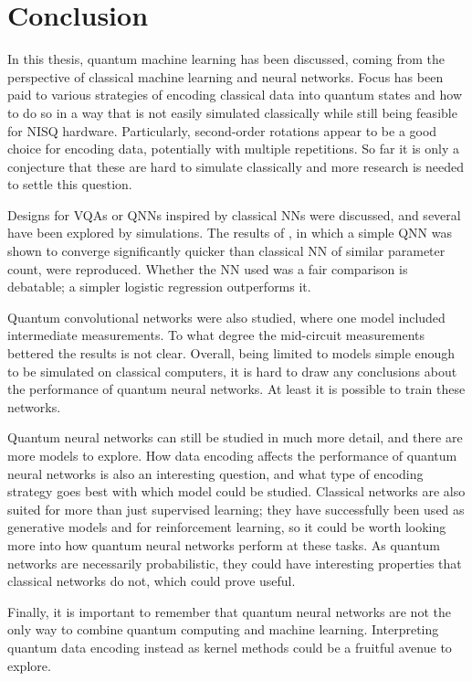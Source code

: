 \chapter{Conclusion}
\label{chap:conclusion}
In this thesis, quantum machine learning has been discussed, coming from the perspective of classical machine learning and neural networks.
Focus has been paid to various strategies of encoding classical data into quantum states and how to do so in a way that is not easily simulated classically while still being feasible for NISQ hardware.
Particularly, second-order rotations appear to be a good choice for encoding data, potentially with multiple repetitions.
So far it is only a conjecture that these are hard to simulate classically and more research is needed to settle this question.

Designs for VQAs or QNNs inspired by classical NNs were discussed, and several have been explored by simulations.
The results of \cite{abbas2021}, in which a simple QNN was shown to converge significantly quicker than classical NN of similar parameter count, were reproduced.
Whether the NN used was a fair comparison is debatable; a simpler logistic regression outperforms it.

Quantum convolutional networks were also studied, where one model included intermediate measurements.
To what degree the mid-circuit measurements bettered the results is not clear.
Overall, being limited to models simple enough to be simulated on classical computers, it is hard to draw any conclusions about the performance of quantum neural networks.
At least it is possible to train these networks.

Quantum neural networks can still be studied in much more detail, and there are more models to explore.
How data encoding affects the performance of quantum neural networks is also an interesting question, and what type of encoding strategy goes best with which model could be studied.
Classical networks are also suited for more than just supervised learning; they have successfully been used as generative models and for reinforcement learning, so it could be worth looking more into how quantum neural networks perform at these tasks.
As quantum networks are necessarily probabilistic, they could have interesting properties that classical networks do not, which could prove useful.

Finally, it is important to remember that quantum neural networks are not the only way to combine quantum computing and machine learning.
Interpreting quantum data encoding instead as kernel methods could be a fruitful avenue to explore.